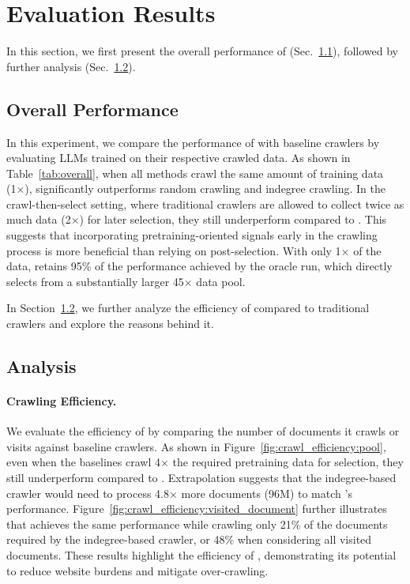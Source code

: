 

\section{Evaluation Results}



In this section, we first present the overall performance of \ours{} (Sec.~\ref{sec:result:overall}), followed by further analysis (Sec.~\ref{sec:result:analysis}).

\subsection{Overall Performance}
\label{sec:result:overall}

In this experiment, we compare the performance of \ours{} with baseline crawlers by evaluating LLMs trained on their respective crawled data.
As shown in Table~\ref{tab:overall}, when all methods crawl the same amount of training data (1×), \ours{} significantly outperforms random crawling and indegree crawling.
In the crawl-then-select setting, where traditional crawlers are allowed to collect twice as much data (2×) for later selection, they still underperform compared to \ours{}.
This suggests that incorporating pretraining-oriented signals early in the crawling process is more beneficial than relying on post-selection.
With only 1× of the data, \ours{} retains 95\% of the performance achieved by the oracle run, which directly selects from a substantially larger 45× data pool. 

In Section~\ref{sec:result:analysis}, we further analyze the efficiency of \ours{} compared to traditional crawlers and explore the reasons behind it.

\subsection{Analysis}
\label{sec:result:analysis}



\paragraph{Crawling Efficiency.}
We evaluate the efficiency of \ours{} by comparing the number of documents it crawls or visits against baseline crawlers. 
As shown in Figure~\ref{fig:crawl_efficiency:pool}, even when the baselines crawl 4× the required pretraining data for selection, they still underperform compared to \ours{}. 
Extrapolation suggests that the indegree-based crawler would need to process 4.8× more documents (96M) to match \ours{}’s performance. 
Figure~\ref{fig:crawl_efficiency:visited_document} further illustrates that \ours{} achieves the same performance while crawling only 21\% of the documents required by the indegree-based crawler, or 48\% when considering all visited documents.
These results highlight the efficiency of \ours{}, demonstrating its potential to reduce website burdens and mitigate over-crawling.


